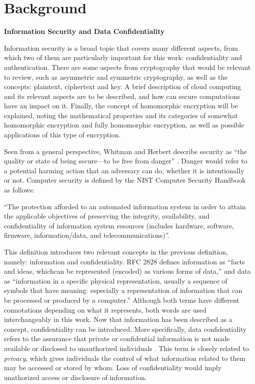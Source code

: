 \chapter{Background}
\label{background}

\textbf{Information Security and Data Confidentiality}

Information security is a broad topic that covers many different aspects, from which two of them are particularly important for this work: confidentiality and authentication. There are some aspects from cryptography that would be relevant to review, such as asymmetric and symmetric cryptography, as well as the concepts: plaintext, ciphertext and key. A brief description of cloud computing and its relevant aspects are to be described, and how can secure computations have an impact on it. Finally, the concept of homomorphic encryption will be explained, noting the mathematical properties and its categories of somewhat homomorphic encryption and fully homomorphic encryption, as well as possible applications of this type of encryption.

Seen from a general perspective, Whitman and Herbert describe security as ``the quality or state of being secure---to be free from danger'' \cite{PrinciplesInformationSecurity}. Danger would refer to a potential harming action that an adversary can do, whether it is intentionally or not. Computer security is defined by the NIST Computer Security Handbook as follows:

``The protection afforded to an automated information system in order to attain the applicable objectives of preserving the integrity, availability, and confidentiality of information system resources (includes hardware, software, firmware, information/data, and telecommunications)''.

This definition introduces two relevant concepts in the previous definition, namely: information and confidentiality. RFC 2828 defines information as ``facts and ideas, whichcan be represented (encoded) as various forms of data,'' and data as ``information in a specific physical representation, usually a sequence of symbols that have meaning: especially a representation of information that can be processed or produced by a computer.'' Although both terms have different connotations depending on what it represents, both words are used interchangeably in this work. Now that information has been described as a concept, confidentiality can be introduced. More specifically, data confidentiality refers to the assurance that private or confidential information is not made available or disclosed to unauthorized individuals \cite{CryptoStallings}. This term is closely related to \textit{privacy}, which gives individuals the control of what information related to them may be accessed or stored by whom. Loss of confidentiality would imply unathorized access or disclosure of information.

